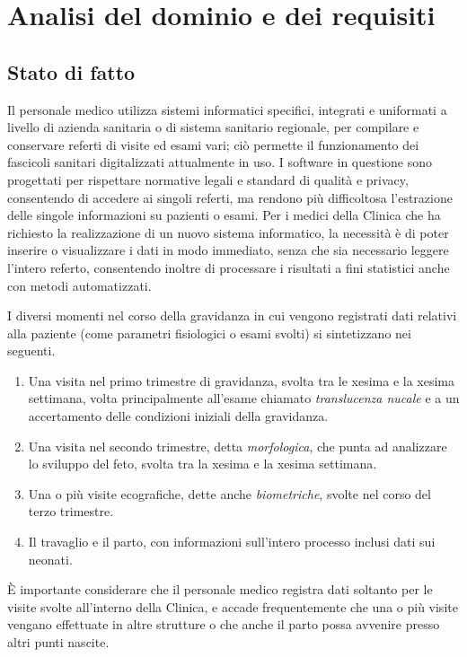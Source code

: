 \chapter{Analisi del dominio e dei requisiti}

\section{Stato di fatto}
\label{problem}

Il personale medico utilizza sistemi informatici specifici, integrati e uniformati a livello di azienda sanitaria o di sistema sanitario regionale, per compilare e conservare referti di visite ed esami vari; ciò permette il funzionamento dei fascicoli sanitari digitalizzati attualmente in uso.
I software in questione sono progettati per rispettare normative legali e standard di qualità e privacy, consentendo di accedere ai singoli referti, ma rendono più difficoltosa l'estrazione delle singole informazioni su pazienti o esami.
Per i medici della Clinica che ha richiesto la realizzazione di un nuovo sistema informatico, la necessità è di poter inserire o visualizzare i dati in modo immediato, senza che sia necessario leggere l'intero referto, consentendo inoltre di processare i risultati a fini statistici anche con metodi automatizzati.

I diversi momenti nel corso della gravidanza in cui vengono registrati dati relativi alla paziente (come parametri fisiologici o esami svolti) si sintetizzano nei seguenti.

\begin{enumerate}
\item Una visita nel primo trimestre di gravidanza, svolta tra le xesima e la xesima settimana, volta principalmente all'esame chiamato \emph{translucenza nucale} e a un accertamento delle condizioni iniziali della gravidanza.
\item Una visita nel secondo trimestre, detta \emph{morfologica}, che punta ad analizzare lo sviluppo del feto, svolta tra la xesima e la xesima settimana.
\item Una o più visite ecografiche, dette anche \emph{biometriche}, svolte nel corso del terzo trimestre.
\item Il travaglio e il parto, con informazioni sull'intero processo inclusi dati sui neonati.
\end{enumerate}

È importante considerare che il personale medico registra dati soltanto per le visite svolte all'interno della Clinica, e accade frequentemente che una o più visite vengano effettuate in altre strutture o che anche il parto possa avvenire presso altri punti nascite.

